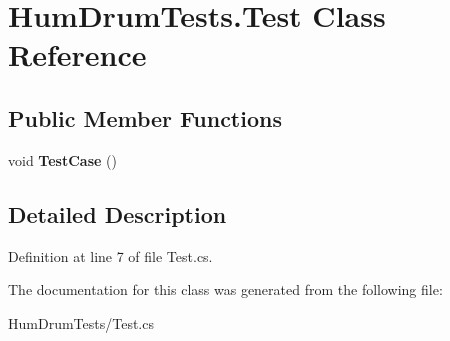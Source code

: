 \hypertarget{classHumDrumTests_1_1Test}{}\section{Hum\+Drum\+Tests.\+Test Class Reference}
\label{classHumDrumTests_1_1Test}
\subsection*{Public Member Functions}
\begin{DoxyCompactItemize}
\item 
\hypertarget{classHumDrumTests_1_1Test_a4beeda58524488aabd71179fd5dcf8f8}{}void {\bfseries Test\+Case} ()\label{classHumDrumTests_1_1Test_a4beeda58524488aabd71179fd5dcf8f8}

\end{DoxyCompactItemize}


\subsection{Detailed Description}


Definition at line 7 of file Test.\+cs.



The documentation for this class was generated from the following file\+:\begin{DoxyCompactItemize}
\item 
Hum\+Drum\+Tests/Test.\+cs\end{DoxyCompactItemize}
